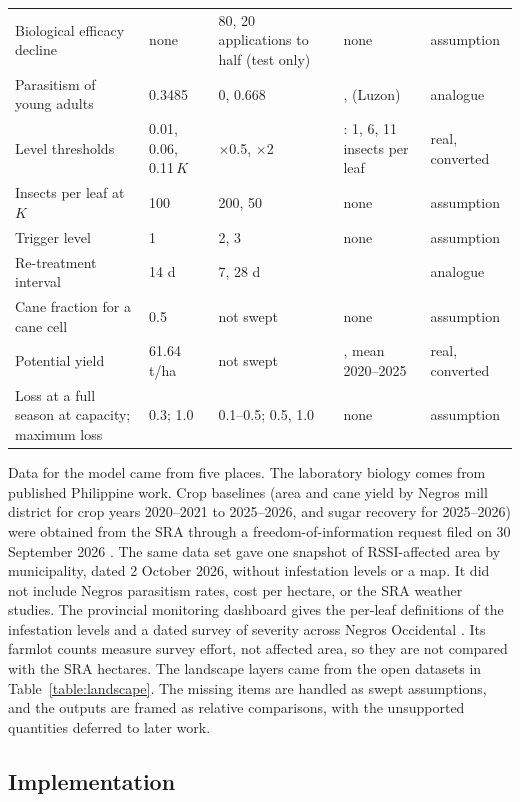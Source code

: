 {\begin{longtable}{L{0.25\textwidth}L{0.15\textwidth}L{0.15\textwidth}L{0.2\textwidth}L{0.11\textwidth}}
Biological efficacy decline & none & 80, 20 applications to half (test only) & none & assumption \\
Parasitism of young adults & 0.3485 & 0, 0.668 & \citet{Guerrero2024}, \citet{Navasero2023} (Luzon) & analogue \\
Level thresholds & 0.01, 0.06, 0.11\,$K$ & $\times$0.5, $\times$2 & \citet{PGNO2026}: 1, 6, 11 insects per leaf & real, converted \\
Insects per leaf at $K$ & 100 & 200, 50 & none & assumption \\
Trigger level & 1 & 2, 3 & none & assumption \\
Re-treatment interval & 14 d & 7, 28 d & \citet{SRAnd} & analogue \\
Cane fraction for a cane cell & 0.5 & not swept & none & assumption \\
Potential yield & 61.64 t/ha & not swept & \citet{SRA2026FOI}, mean 2020--2025 & real, converted \\
Loss at a full season at capacity; maximum loss & 0.3; 1.0 & 0.1--0.5; 0.5, 1.0 & none & assumption \\
\end{longtable}
}

Data for the model came from five places. The laboratory biology comes from published Philippine work. Crop baselines (area and cane yield by Negros mill district for crop years 2020--2021 to 2025--2026, and sugar recovery for 2025--2026) were obtained from the SRA through a freedom-of-\allowbreak information request filed on 30 September 2026 \citep{SRA2026FOI}. The same data set gave one snapshot of RSSI-affected area by municipality, dated 2 October 2026, without infestation levels or a map. It did not include Negros parasitism rates, cost per hectare, or the SRA weather studies. The provincial monitoring dashboard gives the per-leaf definitions of the infestation levels and a dated survey of severity across Negros Occidental \citep{PGNO2026}. Its farmlot counts measure survey effort, not affected area, so they are not compared with the SRA hectares. The landscape layers came from the open datasets in Table~\ref{table:landscape}. The missing items are handled as swept assumptions, and the outputs are framed as relative comparisons, with the unsupported quantities deferred to later work.

\subsection{Implementation}

